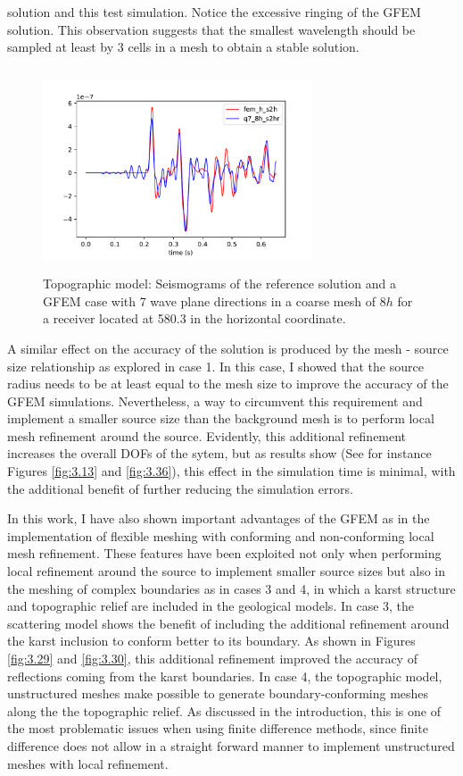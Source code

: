 solution and this test simulation. Notice the excessive ringing of the GFEM solution. This observation suggests that the smallest wavelength should be sampled at least by 3 cells in a mesh to obtain a stable solution.

 \begin{figure}[h!]
	\centering
	\includegraphics[width=8cm, height=6cm]{Thesis_Edith/figures/topo/topo_waves/gfem7_topo_tr75.pdf}
	\caption{Topographic model: Seismograms of the reference solution and a GFEM case with 7 wave plane directions in a coarse mesh of $8h$ for a receiver located at 580.3 in the horizontal coordinate.}
	\label{fig:4.1}
\end{figure}

A similar effect on the accuracy of the solution is produced by the mesh - source size relationship as explored in case 1. In this case, I showed that the source radius needs to be at least equal to the mesh size to improve the accuracy of the GFEM simulations. Nevertheless, a way to circumvent this requirement  and  implement a smaller source size than the background mesh is to perform local mesh refinement around the source. Evidently, this additional refinement increases the overall DOFs of the sytem, but as results show (See for instance Figures \ref{fig:3.13} and  \ref{fig:3.36}), this effect in the simulation time is minimal, with the additional benefit of further reducing the simulation errors.  

In this work, I have also shown important advantages of the GFEM  as in the implementation of flexible meshing with conforming and non-conforming local mesh refinement. These features have been exploited not only when performing local refinement around the source to implement smaller source sizes but also in the meshing of complex boundaries as in cases 3 and 4, in which a karst structure and topographic relief are included in the geological models. In case 3, the scattering model shows the benefit of including the additional refinement around the karst inclusion to conform better to its boundary.  As shown in Figures \ref{fig:3.29} and \ref{fig:3.30}, this additional refinement improved the accuracy of reflections coming from the karst boundaries. In case 4, the topographic model, unstructured meshes make possible to generate boundary-conforming meshes along the the topographic relief. As discussed in the introduction, this is one of the most problematic issues when using finite difference methods, since finite difference does not allow in a straight forward manner to implement unstructured meshes with local refinement.

